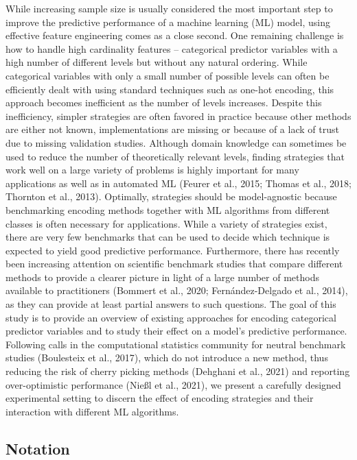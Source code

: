 \documentclass[smallextended]{svjour3}       %
\begin{document}
While increasing sample size is usually considered the most important step to improve the predictive performance of a machine learning (ML) model, using effective feature engineering comes as a close second. One remaining challenge is how to handle high cardinality features -- categorical predictor variables with a high number of different levels but without any natural ordering.
While categorical variables with only a small number of possible levels can often be efficiently dealt with using standard techniques such as one-hot encoding, this approach becomes inefficient as the number of levels increases.
Despite this inefficiency, simpler strategies are often favored in practice because other methods are either not known, implementations are missing or because of a lack of trust due to missing validation studies.
Although domain knowledge can sometimes be used to reduce the number of theoretically relevant levels, finding strategies that work well on a large variety of problems is highly important for many applications as well as in automated ML (Feurer et al., 2015; Thomas et al., 2018; Thornton et al., 2013). Optimally, strategies should be model-agnostic because benchmarking encoding methods together with ML algorithms from different classes is often necessary for applications.
While a variety of strategies exist, there are very few benchmarks that can be used to decide which technique is expected to yield good predictive performance.
Furthermore, there has recently been increasing attention on scientific benchmark studies that compare different methods to provide a clearer picture in light of a large number of methods available to practitioners (Bommert et al., 2020; Fernández-Delgado et al., 2014), as they can provide at least partial answers to such questions.
The goal of this study is to provide an overview of existing approaches for encoding categorical predictor variables and to study their effect on a model's predictive performance.
Following calls in the computational statistics community for neutral benchmark studies (Boulesteix et al., 2017), which do not introduce a new method, thus reducing the risk of cherry picking methods (Dehghani et al., 2021) and reporting over-optimistic performance (Nie{\ss}l et al., 2021), we present a carefully designed experimental setting to discern the effect of encoding strategies and their interaction with different ML algorithms.

\hypertarget{notation}{%
\subsection{Notation}\label{notation}}
\end{document}
